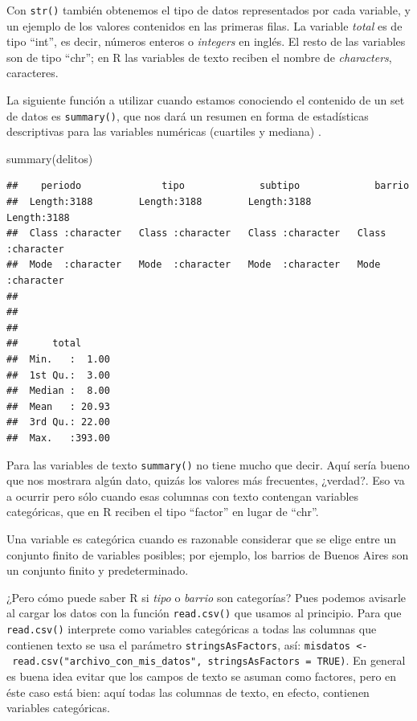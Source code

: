 \documentclass[
]{book}
\newenvironment{Shaded}{\begin{snugshade}}{\end{snugshade}}
\newcommand{\FunctionTok}[1]{\textcolor[rgb]{0.00,0.00,0.00}{#1}}
\newcommand{\NormalTok}[1]{#1}
\begin{document}
Con \texttt{str()} también obtenemos el tipo de datos representados por cada variable, y un ejemplo de los valores contenidos en las primeras filas. La variable \emph{total} es de tipo ``int'', es decir, números enteros o \emph{integers} en inglés. El resto de las variables son de tipo ``chr''; en R las variables de texto reciben el nombre de \emph{characters}, caracteres.

La siguiente función a utilizar cuando estamos conociendo el contenido de un set de datos es \texttt{summary()}, que nos dará un resumen en forma de estadísticas descriptivas para las variables numéricas (cuartiles y mediana) .

\begin{Shaded}
\begin{Highlighting}[]
\FunctionTok{summary}\NormalTok{(delitos)}
\end{Highlighting}
\end{Shaded}

\begin{verbatim}
##    periodo              tipo             subtipo             barrio         
##  Length:3188        Length:3188        Length:3188        Length:3188       
##  Class :character   Class :character   Class :character   Class :character  
##  Mode  :character   Mode  :character   Mode  :character   Mode  :character  
##                                                                             
##                                                                             
##                                                                             
##      total       
##  Min.   :  1.00  
##  1st Qu.:  3.00  
##  Median :  8.00  
##  Mean   : 20.93  
##  3rd Qu.: 22.00  
##  Max.   :393.00
\end{verbatim}

Para las variables de texto \texttt{summary()} no tiene mucho que decir. Aquí sería bueno que nos mostrara algún dato, quizás los valores más frecuentes, ¿verdad?. Eso va a ocurrir pero sólo cuando esas columnas con texto contengan variables categóricas, que en R reciben el tipo ``factor'' en lugar de ``chr''.

Una variable es categórica cuando es razonable considerar que se elige entre un conjunto finito de variables posibles; por ejemplo, los barrios de Buenos Aires son un conjunto finito y predeterminado.

¿Pero cómo puede saber R si \emph{tipo} o \emph{barrio} son categorías? Pues podemos avisarle al cargar los datos con la función \texttt{read.csv()} que usamos al principio. Para que \texttt{read.csv()} interprete como variables categóricas a todas las columnas que contienen texto se usa el parámetro \texttt{stringsAsFactors}, así: \texttt{misdatos\ \textless{}-\ read.csv("archivo\_con\_mis\_datos",\ stringsAsFactors\ =\ TRUE)}. En general es buena idea evitar que los campos de texto se asuman como factores, pero en éste caso está bien: aquí todas las columnas de texto, en efecto, contienen variables categóricas.
\end{document}
